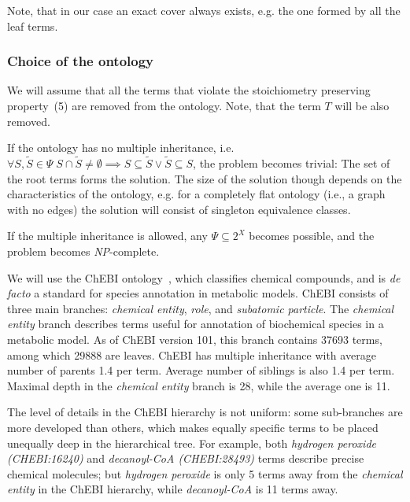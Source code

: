 \documentclass[10pt]{bmc_article}
\newenvironment{bmcformat}{\baselineskip20pt\sloppy\setboolean{publ}{false}}{\baselineskip20pt\sloppy}
\begin{document}
\begin{bmcformat}
Note, that in our case an exact cover always exists, e.g. the one formed by all the leaf terms.

\subsubsection*{Choice of the ontology}
We will assume that all the terms that violate the stoichiometry preserving property~(5) are removed from the ontology. Note, that the term $T$ will be also removed.


If the ontology has no multiple inheritance, i.e. $\forall S, \tilde{S} \in \Psi \; S \cap \tilde{S} \neq \emptyset \implies S \subseteq \tilde{S} \lor \tilde{S} \subseteq S$, the problem becomes trivial: The set of the root terms forms the solution. The size of the solution though depends on the characteristics of the ontology, e.g. for a completely flat ontology (i.e., a graph with no edges) the solution will consist of singleton equivalence classes.

If the multiple inheritance is allowed, any $\Psi \subseteq 2^X$ becomes possible, and the problem becomes \textit{NP}-complete. 

We will use the ChEBI ontology~\cite{deMatos10}, which classifies chemical compounds, and is \textit{de facto} a standard for species annotation in metabolic models. ChEBI consists of three main branches: \textit{chemical entity}, \textit{role}, and \textit{subatomic particle}. The \textit{chemical entity} branch describes terms useful for annotation of biochemical species in a metabolic model. As of ChEBI version 101, this branch contains 37693 terms, among which 29888 are leaves. ChEBI has multiple inheritance with average number of parents 1.4 per term. Average number of siblings is also 1.4 per term. Maximal depth in the \textit{chemical entity} branch is 28, while the average one is 11.

The level of details in the ChEBI hierarchy is not uniform: some sub-branches are more developed than others, which makes equally specific terms to be placed unequally deep in the hierarchical tree. For example, both \textit{hydrogen peroxide (CHEBI:16240)} and \textit{decanoyl-CoA (CHEBI:28493)} terms describe precise chemical molecules; but \textit{hydrogen peroxide} is only 5 terms away from the \textit{chemical entity} in the ChEBI hierarchy, while \textit{decanoyl-CoA} is 11 terms away. 


\end{bmcformat}
\end{document}
